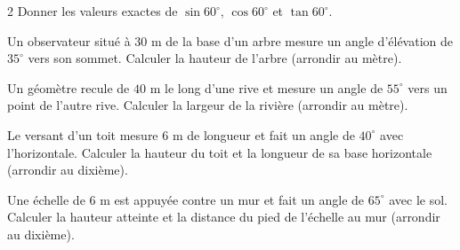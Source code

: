 \begin{multicols}{2}
\exo{} Donner les valeurs exactes de $\sin60^{\circ}$, $\cos60^{\circ}$ et
$\tan60^{\circ}$.

\exo{} Un observateur situé à $30$ m de la base d'un arbre mesure un angle
d'élévation de $35^{\circ}$ vers son sommet. Calculer la hauteur de l'arbre (arrondir au
mètre).

\exo{} Un géomètre recule de $40$ m le long d'une rive et mesure un angle de
$55^{\circ}$ vers un point de l'autre rive. Calculer la largeur de la rivière (arrondir au
mètre).

\exo{} Le versant d'un toit mesure $6$ m de longueur et fait un angle de
$40^{\circ}$ avec l'horizontale. Calculer la hauteur du toit et la longueur de sa base
horizontale (arrondir au dixième).

\exo{} Une échelle de $6$ m est appuyée contre un mur et fait un angle de
$65^{\circ}$ avec le sol. Calculer la hauteur atteinte et la distance du pied de l'échelle
au mur (arrondir au dixième).

\end{multicols}

